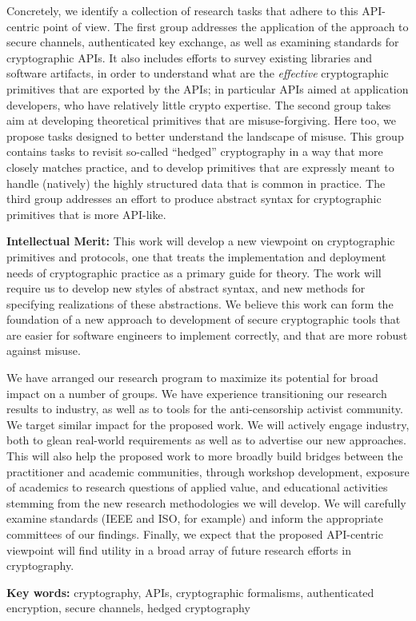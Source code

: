 \documentclass[10pt]{article}
\begin{document}
Concretely, we identify a collection of research tasks that adhere to
this API-centric point of view.  The first group addresses the
application of the approach to secure channels, authenticated key
exchange, as well as examining standards for cryptographic APIs.  It
also includes efforts to survey existing libraries and software
artifacts, in order to understand what are the \emph{effective}
cryptographic primitives that are exported by the APIs; in particular
APIs aimed at application developers, who have relatively little
crypto expertise.  
%
The second group takes aim at developing
theoretical primitives that are misuse-forgiving.  Here too, we
propose tasks designed to better understand the landscape of misuse.
This group contains tasks to revisit so-called ``hedged'' cryptography
in a way that more closely matches practice, and to develop primitives
that are expressly meant to handle (natively) the highly structured
data that is common in practice.
%
The third group addresses an effort to produce abstract syntax for
cryptographic primitives that is more API-like.
  

\smallskip
\noindent \textbf{Intellectual Merit:} This work will develop a new
viewpoint on cryptographic primitives and protocols, one that treats the
implementation and deployment needs of cryptographic practice as a
primary guide for theory.  The work will require us to develop new styles of
abstract syntax, and new methods for specifying realizations of these
abstractions.  
We believe this work can form the foundation of a new approach to
development of secure cryptographic tools that are easier for
software engineers to implement correctly, and that are more robust against
misuse.  

\smallskip

  We have arranged our research program to
maximize its potential for broad impact on a number of groups. We have
experience transitioning our research results to industry, as well as to tools for the anti-censorship
activist community. We target similar impact for the proposed
work. We will actively engage industry, both to glean real-world requirements
as well as to advertise our new approaches.  This will also help
the proposed work to more broadly build bridges between the practitioner
and academic communities, through workshop development, exposure of academics to 
research questions of applied value, and educational activities stemming from
the new research methodologies we will develop. We will carefully examine
standards (IEEE and ISO, for example) and inform the appropriate
committees of our
findings. Finally, we expect that the proposed API-centric viewpoint will find utility in a broad array
of future research efforts in cryptography.

\vspace{1ex}
\noindent 
{\bf Key words:} cryptography, APIs, cryptographic formalisms,
authenticated encryption, secure channels, hedged cryptography
\end{document}
